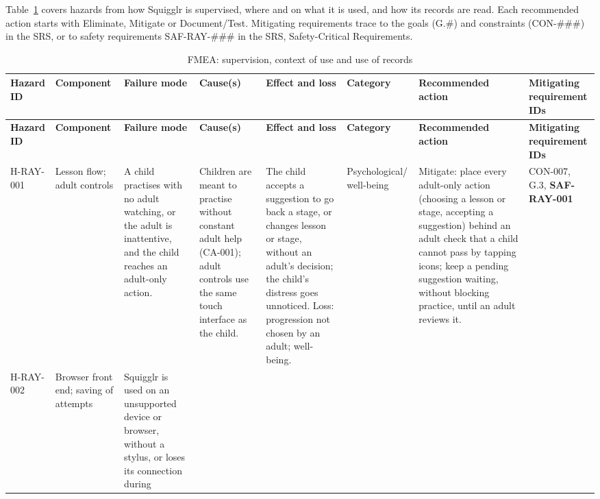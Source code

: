\documentclass{article}
\newenvironment{fmealandscape}{
    \begin{landscape}
    \pagestyle{empty}
    \AddToShipoutPictureFG{ \AtPageLowerLeft{
        \put(\LenToUnit{\dimexpr\paperwidth-1.5cm\relax},
        \LenToUnit{.5\paperheight}){ \makebox(0,0)[c]{\rotatebox{90}{\thepage}}
        } } } }{
    \end{landscape}
    \ClearShipoutPictureFG }
\begin{document}
Table~\ref{tab:fmea-ray} covers hazards from how Squigglr is supervised, where
and on what it is used, and how its records are read. Each recommended action
starts with Eliminate, Mitigate or Document/Test. Mitigating requirements trace
to the goals (G.\#) and constraints (CON-\#\#\#) in the SRS, or to safety
requirements SAF-RAY-\#\#\# in the SRS, Safety-Critical Requirements.

\begin{fmealandscape}
{\footnotesize
\setlength{\tabcolsep}{3pt}
\begin{longtable}{@{}
  >{\raggedright\arraybackslash}p{1.4cm} >{\raggedright\arraybackslash}p{1.8cm}
  >{\raggedright\arraybackslash}p{2.4cm} >{\raggedright\arraybackslash}p{2.3cm}
  >{\raggedright\arraybackslash}p{2.6cm} >{\raggedright\arraybackslash}p{1.9cm}
  >{\raggedright\arraybackslash}p{3.4cm}
  >{\raggedright\arraybackslash}p{2.0cm}@{}}
\caption{FMEA: supervision, context of use and use of records}
\label{tab:fmea-ray}\\
\toprule
\textbf{Hazard ID} & \textbf{Component} & \textbf{Failure mode} &
\textbf{Cause(s)} & \textbf{Effect and loss} & \textbf{Category} &
\textbf{Recommended action} & \textbf{Mitigating requirement IDs} \\
\midrule
\endfirsthead
\toprule
\textbf{Hazard ID} & \textbf{Component} & \textbf{Failure mode} &
\textbf{Cause(s)} & \textbf{Effect and loss} & \textbf{Category} &
\textbf{Recommended action} & \textbf{Mitigating requirement IDs} \\
\midrule
\endhead
\bottomrule
\endlastfoot
H-RAY-001 & Lesson flow; adult controls & A child practises with no adult
watching, or the adult is inattentive, and the child reaches an adult-only
action. & Children are meant to practise without constant adult help (CA-001);
adult controls use the same touch interface as the child. & The child accepts a
suggestion to go back a stage, or changes lesson or stage, without an adult's
decision; the child's distress goes unnoticed. Loss: progression not chosen by
an adult; well-being. & Psychological/ well-being & Mitigate: place every
adult-only action (choosing a lesson or stage, accepting a suggestion) behind an
adult check that a child cannot pass by tapping icons; keep a pending suggestion
waiting, without blocking practice, until an adult reviews it. & CON-007, G.3,
\textbf{SAF-RAY-001} \\
\addlinespace
H-RAY-002 & Browser front end; saving of attempts & Squigglr is used on an
unsupported device or browser, without a stylus, or loses its connection during

\end{longtable}}
\end{fmealandscape}
\end{document}
